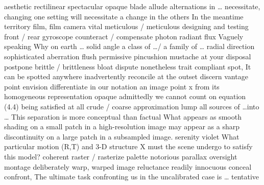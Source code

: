 \documentclass[12pt]{article}
\begin{document}
aesthetic 
rectilinear 
spectacular 
opaque 
blade 
allude 
alternations in \dots 
necessitate, changing one setting will necessitate a change in the others 
In the meantime 
territory 
film, film camera 
vital 
meticulous / meticulous designing and testing 
front / rear 
gyroscope 
counteract / compensate 
photon 
radiant flux 
Vaguely speaking 
Why on earth \dots 
solid angle 
a class of \dots / a family of \dots 
radial direction 
sophisticated 
aberration 
flush 
permissive 
pincushion 
mustache 
at your disposal 
postpone 
brittle / brittleness 
bloat 
dispute 
nonetheless 
trait 
compliant 
spot, It can be spotted anywhere 
inadvertently 
reconcile 
at the outset 
discern 
vantage point 
envision 
differentiate in our notation an image point x from its homogeneous representation 
opaque 
admittedly 
we cannot count on equation (4.4) being satisfied at all 
crude / coarse approximation 
lump all sources of \dots into \dots 
This separation is more conceptual than factual 
What appears as smooth shading on a small patch in a high-resolution image may appear as a sharp discontinuity on a large patch in a subsampled image. 
serenity 
violet 
What particular motion (R,T) and 3-D structure X must the scene undergo to satisfy this model? 
coherent 
raster / rasterize 
palette 
notorious 
parallax 
oversight 
montage 
deliberately 
warp, warped image 
reluctance 
readily 
innocuous 
conceal 
confront, The ultimate task confronting us in the uncalibrated case is \dots 
tentative 
\end{document}
